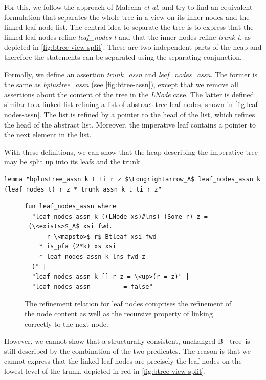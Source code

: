 \documentclass[a4paper,UKenglish,cleveref, autoref, thm-restate]{lipics-v2021}
\newcommand{\btree}{B$^+$-tree}
\begin{document}
For this, we follow the approach of Malecha \emph{et al.} \cite{DBLP:conf/popl/MalechaMSW10} and
try to find an equivalent formulation that separates the whole tree in a
view on its inner nodes and the linked leaf node list.
The central idea to separate the tree is to
express that the linked leaf nodes refine \emph{leaf\_nodes t}
and that the inner nodes refine \emph{trunk t}, as depicted in \autoref{fig:btree-view-split}.
These are two independent parts of the heap and therefore
the statements can be separated using the separating conjunction.

Formally, we define an assertion \emph{trunk\_assn} and \emph{leaf\_nodes\_assn}.
The former is the same as \emph{bplustree\_assn} (see \autoref{fig:btree-assn}),
except that we remove all assertions about the content of the tree in the \emph{LNode} case.
The latter is defined similar to a linked list refining a list of abstract tree leaf nodes,
shown in \autoref{fig:leaf-nodes-assn}.
The list is refined by a pointer to the head of the list,
which refines the head of the abstract list.
Moreover, the imperative leaf contains a pointer to the next element in the list.

With these definitions, we can show that the heap describing the imperative tree may be
split up into its leafs and the trunk.

\begin{lstlisting}[mathescape=true, language=Isabelle,label=lst:btree-view-split-oneway]
lemma "bplustree_assn k t ti r z $\Longrightarrow_A$ leaf_nodes_assn k (leaf_nodes t) r z * trunk_assn k t ti r z"
\end{lstlisting}

\begin{figure}
    \centering
\begin{lstlisting}[mathescape=true, language=Isabelle,label=lst:leaf-nodes-assn]
fun leaf_nodes_assn where
  "leaf_nodes_assn k ((LNode xs)#lns) (Some r) z =
 (\<exists>$_A$ xsi fwd.
      r \<mapsto>$_r$ Btleaf xsi fwd
    * is_pfa (2*k) xs xsi
    * leaf_nodes_assn k lns fwd z
  )" |
  "leaf_nodes_assn k [] r z = \<up>(r = z)" |
  "leaf_nodes_assn _ _ _ _ = false"
\end{lstlisting}
\caption[Definition of \emph{leaf\_nodes\_assn}]{
    The refinement relation for leaf nodes comprises the refinement
    of the node content as well as the recursive property of linking correctly to the next node.
}
\label{fig:leaf-nodes-assn}
\end{figure}


However, we cannot show that a structurally consistent, unchanged \btree\
is still described by the combination of the two predicates.
The reason is that we cannot express that the linked leaf nodes
are precisely the leaf nodes on the lowest level of the trunk, depicted
in red in \autoref{fig:btree-view-split}.
\end{document}
